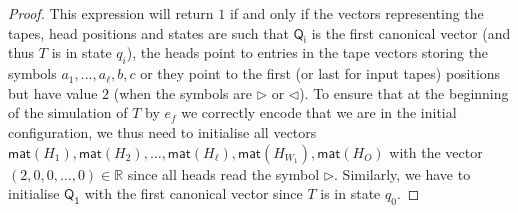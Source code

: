 \begin{proof}
This expression will return $1$ if and only if the vectors representing the tapes, head positions and states are such that $\mathsf{Q_i}$ is the first canonical vector (and thus $T$ is in state $q_i$), the heads point to entries in the tape vectors storing the symbols $a_1,\ldots,a_{\ell}, b,c$ or they point to the first (or last for input tapes) positions but have value $2$ (when the symbols are $\rhd$ or $\lhd$). To ensure that at the beginning of the simulation of $T$ by $e_f$ we correctly encode that we are in the initial configuration, we thus need to initialise all vectors $\mathsf{mat}(H_1),\mathsf{mat}(H_2),\ldots, \mathsf{mat}(H_\ell), \mathsf{mat}(H_{W_1}),\mathsf{mat}(H_O)$ with the vector $(2,0,0,\ldots,0)\in\mathbb{R}$ since all heads read the symbol $\rhd$. Similarly, we have to initialise $\mathsf{Q_1}$ with the first canonical vector since $T$ is in state $q_0$.


\end{proof}
